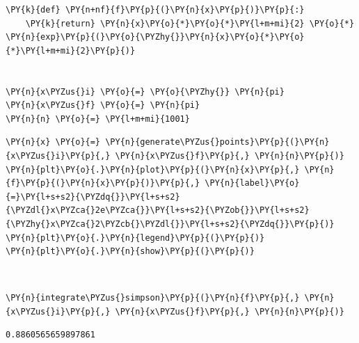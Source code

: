     \begin{tcolorbox}[breakable, size=fbox, boxrule=1pt, pad at break*=1mm,colback=cellbackground, colframe=cellborder]
\begin{Verbatim}[commandchars=\\\{\}]
\PY{k}{def} \PY{n+nf}{f}\PY{p}{(}\PY{n}{x}\PY{p}{)}\PY{p}{:}
    \PY{k}{return} \PY{n}{x}\PY{o}{*}\PY{o}{*}\PY{l+m+mi}{2} \PY{o}{*} \PY{n}{exp}\PY{p}{(}\PY{o}{\PYZhy{}}\PY{n}{x}\PY{o}{*}\PY{o}{*}\PY{l+m+mi}{2}\PY{p}{)}


\PY{n}{x\PYZus{}i} \PY{o}{=} \PY{o}{\PYZhy{}} \PY{n}{pi}
\PY{n}{x\PYZus{}f} \PY{o}{=} \PY{n}{pi}
\PY{n}{n} \PY{o}{=} \PY{l+m+mi}{1001}
\end{Verbatim}
\end{tcolorbox}

    \begin{tcolorbox}[breakable, size=fbox, boxrule=1pt, pad at break*=1mm,colback=cellbackground, colframe=cellborder]
\begin{Verbatim}[commandchars=\\\{\}]
\PY{n}{x} \PY{o}{=} \PY{n}{generate\PYZus{}points}\PY{p}{(}\PY{n}{x\PYZus{}i}\PY{p}{,} \PY{n}{x\PYZus{}f}\PY{p}{,} \PY{n}{n}\PY{p}{)}
\PY{n}{plt}\PY{o}{.}\PY{n}{plot}\PY{p}{(}\PY{n}{x}\PY{p}{,} \PY{n}{f}\PY{p}{(}\PY{n}{x}\PY{p}{)}\PY{p}{,} \PY{n}{label}\PY{o}{=}\PY{l+s+s2}{\PYZdq{}}\PY{l+s+s2}{\PYZdl{}x\PYZca{}2e\PYZca{}}\PY{l+s+s2}{\PYZob{}}\PY{l+s+s2}{\PYZhy{}x\PYZca{}2\PYZcb{}\PYZdl{}}\PY{l+s+s2}{\PYZdq{}}\PY{p}{)}
\PY{n}{plt}\PY{o}{.}\PY{n}{legend}\PY{p}{(}\PY{p}{)}
\PY{n}{plt}\PY{o}{.}\PY{n}{show}\PY{p}{(}\PY{p}{)}
\end{Verbatim}
\end{tcolorbox}

    \begin{center}
    \end{center}
    { \hspace*{\fill} \\}
    
    \begin{tcolorbox}[breakable, size=fbox, boxrule=1pt, pad at break*=1mm,colback=cellbackground, colframe=cellborder]
\begin{Verbatim}[commandchars=\\\{\}]
\PY{n}{integrate\PYZus{}simpson}\PY{p}{(}\PY{n}{f}\PY{p}{,} \PY{n}{x\PYZus{}i}\PY{p}{,} \PY{n}{x\PYZus{}f}\PY{p}{,} \PY{n}{n}\PY{p}{)}
\end{Verbatim}
\end{tcolorbox}

            \begin{tcolorbox}[breakable, size=fbox, boxrule=.5pt, pad at break*=1mm, opacityfill=0]
\begin{Verbatim}[commandchars=\\\{\}]
0.8860565659897861
\end{Verbatim}
\end{tcolorbox}
        

    
    
    
